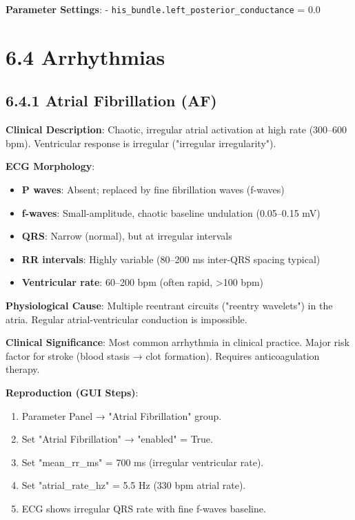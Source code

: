 \documentclass[12pt,oneside,a4paper]{book}
\newcommand{\code}[1]{\texttt{#1}}
\begin{document}
\textbf{Parameter Settings}:
- \code{his\_bundle.left\_posterior\_conductance} = 0.0

\section{6.4 Arrhythmias}

\subsection{6.4.1 Atrial Fibrillation (AF)}

\textbf{Clinical Description}:
Chaotic, irregular atrial activation at high rate (300--600 bpm). Ventricular response is irregular ("irregular irregularity").

\textbf{ECG Morphology}:
\begin{itemize}
  \item \textbf{P waves}: Absent; replaced by fine fibrillation waves (f-waves)
  \item \textbf{f-waves}: Small-amplitude, chaotic baseline undulation (0.05--0.15 mV)
  \item \textbf{QRS}: Narrow (normal), but at irregular intervals
  \item \textbf{RR intervals}: Highly variable (80--200 ms inter-QRS spacing typical)
  \item \textbf{Ventricular rate}: 60--200 bpm (often rapid, \textgreater 100 bpm)
\end{itemize}

\textbf{Physiological Cause}:
Multiple reentrant circuits ("reentry wavelets") in the atria. Regular atrial-ventricular conduction is impossible.

\textbf{Clinical Significance}:
Most common arrhythmia in clinical practice. Major risk factor for stroke (blood stasis → clot formation). Requires anticoagulation therapy.

\textbf{Reproduction (GUI Steps)}:
\begin{enumerate}
  \item Parameter Panel → "Atrial Fibrillation" group.
  \item Set "Atrial Fibrillation" → "enabled" = True.
  \item Set "mean\_rr\_ms" = 700 ms (irregular ventricular rate).
  \item Set "atrial\_rate\_hz" = 5.5 Hz (330 bpm atrial rate).
  \item ECG shows irregular QRS rate with fine f-waves baseline.
\end{enumerate}
\end{document}
